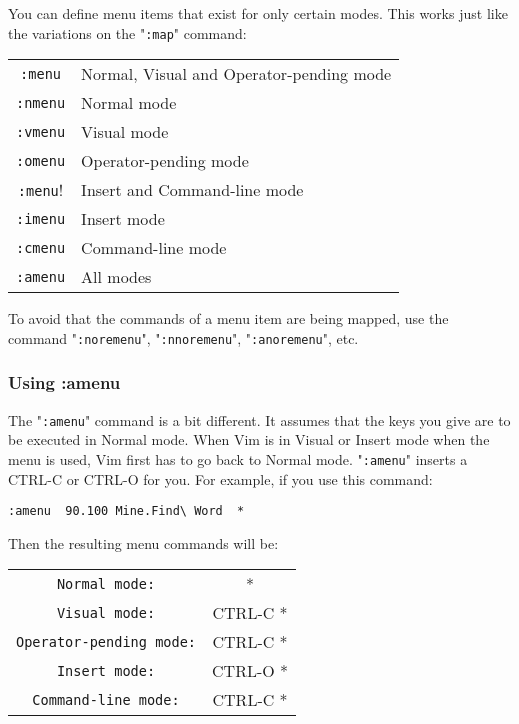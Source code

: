 You can define menu items that exist for only certain modes.
This works just like the variations on the "\verb!:map!" command:
\begin{center} \begin{tabular}{c l}
				\verb!:menu! & Normal, Visual and Operator-pending mode \\
				\verb!:nmenu! & Normal mode \\
				\verb!:vmenu! & Visual mode \\
				\verb!:omenu! & Operator-pending mode \\
				\verb!:menu!! & Insert and Command-line mode \\
				\verb!:imenu! & Insert mode \\
				\verb!:cmenu! & Command-line mode \\
				\verb!:amenu! & All modes \\
\end{tabular} \end{center}
To avoid that the commands of a menu item are being mapped, use the command "\verb!:noremenu!", "\verb!:nnoremenu!", "\verb!:anoremenu!", etc.

\subsubsection{Using :amenu}
The "\verb!:amenu!" command is a bit different.
It assumes that the {keys} you give are to be executed in Normal mode.
When Vim is in Visual or Insert mode when the menu is used, Vim first has to go back to Normal mode.
"\verb!:amenu!" inserts a CTRL-C or CTRL-O for you.
For example, if you use this command:

\begin{Verbatim}[samepage=true]
 :amenu  90.100 Mine.Find\ Word  *
\end{Verbatim}

Then the resulting menu commands will be:

\begin{center} \begin{tabular}{c c}
				\verb!Normal mode:! & * \\
				\verb!Visual mode:! & CTRL-C * \\
				\verb!Operator-pending mode:! & CTRL-C * \\
				\verb!Insert mode:! & CTRL-O * \\
				\verb!Command-line mode:! & CTRL-C * \\
\end{tabular} \end{center}

